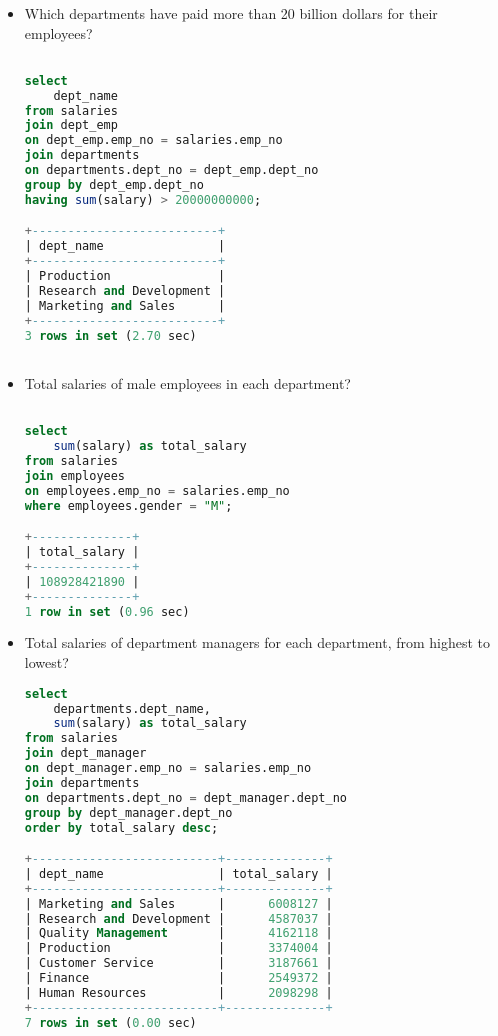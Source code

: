 \documentclass[12pt]{article}
\begin{document}
\begin{itemize}
\begin{lstlisting}[language=SQL]
\end{lstlisting}


\item Which departments have paid more than 20 billion dollars for their employees?
\begin{lstlisting}[language=SQL]

select  
	dept_name
from salaries
join dept_emp
on dept_emp.emp_no = salaries.emp_no
join departments
on departments.dept_no = dept_emp.dept_no
group by dept_emp.dept_no
having sum(salary) > 20000000000;

+--------------------------+
| dept_name                |
+--------------------------+
| Production               |
| Research and Development |
| Marketing and Sales      |
+--------------------------+
3 rows in set (2.70 sec)



\end{lstlisting}


\item Total salaries of male employees in each department?
\begin{lstlisting}[language=SQL]

select  
	sum(salary) as total_salary
from salaries
join employees
on employees.emp_no = salaries.emp_no 
where employees.gender = "M";

+--------------+
| total_salary |
+--------------+
| 108928421890 |
+--------------+
1 row in set (0.96 sec)

\end{lstlisting}


\item Total salaries of department managers for each department, from highest to lowest?
\begin{lstlisting}[language=SQL]
select  
	departments.dept_name,
	sum(salary) as total_salary
from salaries
join dept_manager
on dept_manager.emp_no = salaries.emp_no 
join departments
on departments.dept_no = dept_manager.dept_no
group by dept_manager.dept_no
order by total_salary desc;

+--------------------------+--------------+
| dept_name                | total_salary |
+--------------------------+--------------+
| Marketing and Sales      |      6008127 |
| Research and Development |      4587037 |
| Quality Management       |      4162118 |
| Production               |      3374004 |
| Customer Service         |      3187661 |
| Finance                  |      2549372 |
| Human Resources          |      2098298 |
+--------------------------+--------------+
7 rows in set (0.00 sec)

\end{lstlisting}

\end{itemize}



 
\end{document}
